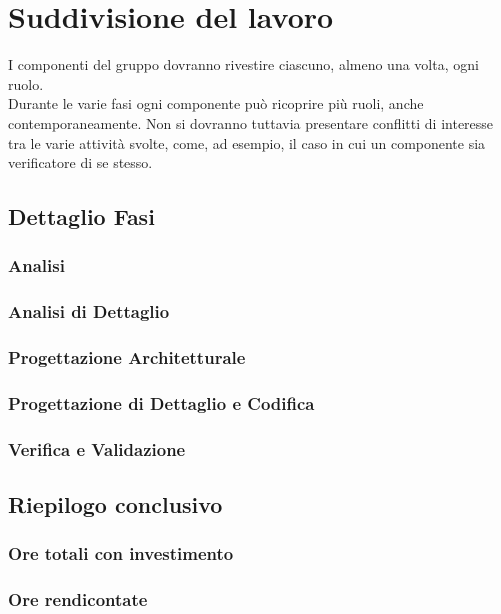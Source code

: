 \section{Suddivisione del lavoro}
	I componenti del gruppo dovranno rivestire ciascuno, almeno una volta, ogni ruolo. \\
	Durante le varie fasi ogni componente può ricoprire più ruoli, anche contemporaneamente. Non si dovranno tuttavia presentare conflitti di interesse tra le varie attività svolte, come, ad esempio, il caso in cui un componente sia verificatore di se stesso.
\subsection{Dettaglio Fasi}
\subsubsection{Analisi}
\subsubsection{Analisi di Dettaglio}
\subsubsection{Progettazione Architetturale}
\subsubsection{Progettazione di Dettaglio e Codifica}
\subsubsection{Verifica e Validazione}
\subsection{Riepilogo conclusivo}
\subsubsection{Ore totali con investimento}
\subsubsection{Ore rendicontate}